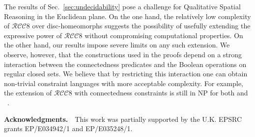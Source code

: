 \documentclass{article}
\newcommand{\NP}{\textsc{NP}}
\newcommand{\RCCE}{\ensuremath{\mathcal{RCC}8}}\newcommand{\RCCF}{\ensuremath{\mathcal{RCC}5}}\newcommand{\BRCCE}{\ensuremath{\mathcal{BRCC}8}}\newcommand{\RCCEc}{\ensuremath{\RCCE{}c}}\newcommand{\RCCEci}{\ensuremath{\RCCE{}c^\circ}}\newcommand{\cBCc}{\ensuremath{\mathcal{C}c}}\newcommand{\cBCci}{\ensuremath{\mathcal{C}c^\circ}}
\begin{document}
The results of Sec.~\ref{sec:undecidability} pose a challenge for
Qualitative Spatial Reasoning in the Euclidean plane.  On the one hand, the
relatively low complexity of \RCCE{} over disc-homeomorphs suggests
the possibility of usefully extending the expressive power of \RCCE{}
without compromising computational properties. On the other hand, our
results impose severe limits on any such extension.  We observe,
however, that the constructions used in the proofs depend on a strong
interaction between the connectedness predicates and the Boolean
operations on regular closed sets. We believe that by restricting this
interaction one can obtain non-trivial constraint languages with more
acceptable complexity. For example, the extension of \RCCE{} with
connectedness constraints is still in \NP{} for both  and
~\cite{ijcai:kphz10}.


\smallskip
\noindent
{\bf Acknowledgments.}\ \ This work was partially supported by the U.K. EPSRC grants EP/E034942/1 and EP/E035248/1.




\end{document}
